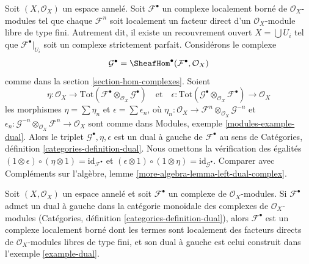 \begin{example}

\label{example-dual}

Soit $(X, \mathcal{O}_X)$ un espace annelé. Soit $\mathcal{F}^\bullet$
un complexe localement borné de $\mathcal{O}_X$-modules tel que chaque
$\mathcal{F}^n$ soit localement un facteur direct d'un $\mathcal{O}_X$-module libre de type fini. Autrement dit, il existe un recouvrement ouvert
$X = \bigcup U_i$ tel que $\mathcal{F}^\bullet|_{U_i}$ soit un complexe strictement parfait. Considérons le complexe
$$
\mathcal{G}^\bullet = \SheafHom^\bullet(\mathcal{F}^\bullet, \mathcal{O}_X)
$$
comme dans la section \ref{section-hom-complexes}. Soient
$$
\eta :
\mathcal{O}_X
\to
\text{Tot}(\mathcal{F}^\bullet \otimes_{\mathcal{O}_X} \mathcal{G}^\bullet)
\quad\text{et}\quad
\epsilon :
\text{Tot}(\mathcal{G}^\bullet \otimes_{\mathcal{O}_X} \mathcal{F}^\bullet)
\to
\mathcal{O}_X
$$
les morphismes $\eta = \sum \eta_n$ et $\epsilon = \sum \epsilon_n$,
où $\eta_n : \mathcal{O}_X \to
\mathcal{F}^n \otimes_{\mathcal{O}_X} \mathcal{G}^{-n}$
et
$\epsilon_n : \mathcal{G}^{-n} \otimes_{\mathcal{O}_X} \mathcal{F}^n
\to \mathcal{O}_X$ sont comme dans Modules, exemple \ref{modules-example-dual}. Alors le triplet $\mathcal{G}^\bullet, \eta, \epsilon$
est un dual à gauche de $\mathcal{F}^\bullet$ au sens de Catégories, définition \ref{categories-definition-dual}. Nous omettons la vérification des égalités
$(1 \otimes \epsilon) \circ (\eta \otimes 1) = \text{id}_{\mathcal{F}^\bullet}$
et
$(\epsilon \otimes 1) \circ (1 \otimes \eta) =
\text{id}_{\mathcal{G}^\bullet}$. Comparer avec Compléments sur l'algèbre, lemme \ref{more-algebra-lemma-left-dual-complex}.

\end{example}

\begin{lemma}

\label{lemma-left-dual-complex}
Soit $(X, \mathcal{O}_X)$ un espace annelé et soit $\mathcal{F}^\bullet$ un complexe de $\mathcal{O}_X$-modules. Si $\mathcal{F}^\bullet$ admet un dual à gauche dans la catégorie monoïdale des complexes de $\mathcal{O}_X$-modules (Catégories, définition \ref{categories-definition-dual}), alors $\mathcal{F}^\bullet$ est un complexe localement borné dont les termes sont localement des facteurs directs de $\mathcal{O}_X$-modules libres de type fini, et son dual à gauche est celui construit dans l'exemple \ref{example-dual}.
\end{lemma}

